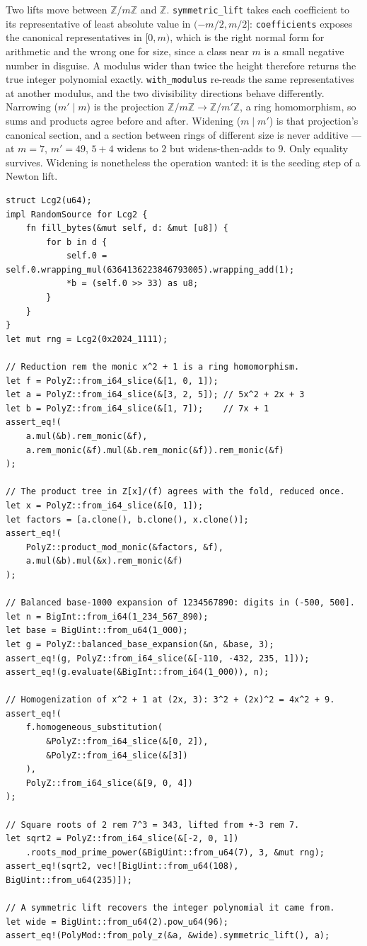 \documentclass[11pt]{article}
\newcommand{\code}[1]{\texttt{#1}}
\newcommand{\Z}{\mathbb{Z}}
\begin{document}
Two lifts move between $\Z/m\Z$ and $\Z$. \code{symmetric\_lift} takes each
coefficient to its representative of least absolute value in $(-m/2, m/2]$:
\code{coefficients} exposes the canonical representatives in $[0, m)$,
which is the right normal form for arithmetic and the wrong one for size,
since a class near $m$ is a small negative number in disguise. A modulus
wider than twice the height therefore returns the true integer polynomial
exactly. \code{with\_modulus} re-reads the same representatives at another
modulus, and the two divisibility directions behave differently. Narrowing
($m' \mid m$) is the projection $\Z/m\Z \to \Z/m'\Z$, a ring
homomorphism, so sums and products agree before and after. Widening
($m \mid m'$) is that projection's canonical section, and a section
between rings of different size is never additive --- at $m = 7$,
$m' = 49$, $5 + 4$ widens to $2$ but widens-then-adds to $9$. Only
equality survives. Widening is nonetheless the operation wanted: it is the
seeding step of a Newton lift.

\begin{lstlisting}
struct Lcg2(u64);
impl RandomSource for Lcg2 {
    fn fill_bytes(&mut self, d: &mut [u8]) {
        for b in d {
            self.0 = self.0.wrapping_mul(6364136223846793005).wrapping_add(1);
            *b = (self.0 >> 33) as u8;
        }
    }
}
let mut rng = Lcg2(0x2024_1111);

// Reduction rem the monic x^2 + 1 is a ring homomorphism.
let f = PolyZ::from_i64_slice(&[1, 0, 1]);
let a = PolyZ::from_i64_slice(&[3, 2, 5]); // 5x^2 + 2x + 3
let b = PolyZ::from_i64_slice(&[1, 7]);    // 7x + 1
assert_eq!(
    a.mul(&b).rem_monic(&f),
    a.rem_monic(&f).mul(&b.rem_monic(&f)).rem_monic(&f)
);

// The product tree in Z[x]/(f) agrees with the fold, reduced once.
let x = PolyZ::from_i64_slice(&[0, 1]);
let factors = [a.clone(), b.clone(), x.clone()];
assert_eq!(
    PolyZ::product_mod_monic(&factors, &f),
    a.mul(&b).mul(&x).rem_monic(&f)
);

// Balanced base-1000 expansion of 1234567890: digits in (-500, 500].
let n = BigInt::from_i64(1_234_567_890);
let base = BigUint::from_u64(1_000);
let g = PolyZ::balanced_base_expansion(&n, &base, 3);
assert_eq!(g, PolyZ::from_i64_slice(&[-110, -432, 235, 1]));
assert_eq!(g.evaluate(&BigInt::from_i64(1_000)), n);

// Homogenization of x^2 + 1 at (2x, 3): 3^2 + (2x)^2 = 4x^2 + 9.
assert_eq!(
    f.homogeneous_substitution(
        &PolyZ::from_i64_slice(&[0, 2]),
        &PolyZ::from_i64_slice(&[3])
    ),
    PolyZ::from_i64_slice(&[9, 0, 4])
);

// Square roots of 2 rem 7^3 = 343, lifted from +-3 rem 7.
let sqrt2 = PolyZ::from_i64_slice(&[-2, 0, 1])
    .roots_mod_prime_power(&BigUint::from_u64(7), 3, &mut rng);
assert_eq!(sqrt2, vec![BigUint::from_u64(108), BigUint::from_u64(235)]);

// A symmetric lift recovers the integer polynomial it came from.
let wide = BigUint::from_u64(2).pow_u64(96);
assert_eq!(PolyMod::from_poly_z(&a, &wide).symmetric_lift(), a);
\end{lstlisting}
\end{document}
